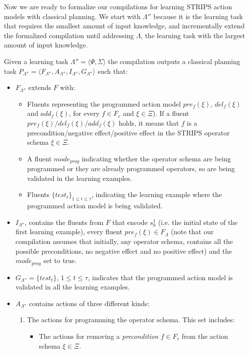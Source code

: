 \documentclass[letterpaper]{article} %
\newcommand{\tup}[1]{{\langle #1 \rangle}}
\begin{document}
Now we are ready to formalize our compilations for learning STRIPS action models with classical planning. We start with $\Lambda''$ because it is the learning task that requires the smallest amount of input knowledge, and incrementally extend the formalized compilation until addressing $\Lambda$, the learning task with the largest amount of input knowledge.

Given a learning task $\Lambda''=\tup{\Psi,\Sigma}$ the compilation outputs a classical planning task $P_{\Lambda''}=\tup{F_{\Lambda''},A_{\Lambda''},I_{\Lambda''},G_{\Lambda''}}$ such that:
\begin{itemize}
\item $F_{\Lambda''}$ extends $F$ with:
\begin{itemize}
\item Fluents representing the programmed action model $pre_f(\xi)$, $del_f(\xi)$ and $add_f(\xi)$, for every $f\in F_v$ and $\xi \in \Xi$). If a fluent $pre_f(\xi)/del_f(\xi)/add_f(\xi)$ holds, it means that $f$ is a precondition/negative effect/positive effect in the STRIPS operator schema $\xi\in \Xi$. 
\item A fluent $mode_{prog}$ indicating whether the operator schema are being programmed or they are already programmed operators, so are being validated in the learning examples. 
\item Fluents $\{test_t\}_{1\leq t\leq \tau}$, indicating the learning example where the programmed action model is being validated.
\end{itemize}
\item $I_{\Lambda''}$, contains the fluents from $F$ that encode $s_0^1$ (i.e. the initial state of the first learning example), every fluent $pre_f(\xi)\in F_{\Lambda}$ (note that our compilation assumes that initially, any operator schema, contains all the possible preconditions, no negative effect and no positive effect) and the $mode_{prog}$ set to true. 
\item $G_{\Lambda''}=\{test_t\}$, {\small $1\leq t\leq \tau$}, indicates that the programmed action model is validated in all the learning examples.
\item $A_{\Lambda''}$ contains actions of three different kinds:
\begin{enumerate}
\item The actions for programming the operator schema. This set includes:
\begin{itemize}
\item The actions for removing a {\em precondition} $f\in F_v$ from the action schema $\xi\in\Xi$.


\end{itemize}
\end{enumerate}
\end{itemize}
\end{document}
